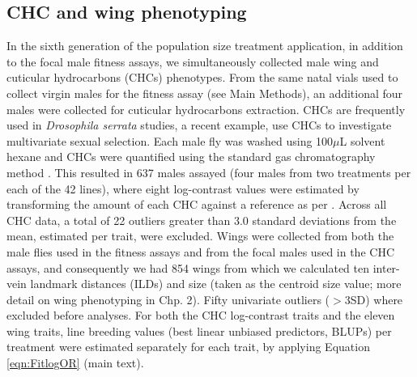 \subsection{CHC and wing phenotyping}
In the sixth generation of the population size treatment application, in addition to the focal male fitness assays, we simultaneously collected male wing and cuticular hydrocarbons (CHCs) phenotypes. From the same natal vials used to collect virgin males for the fitness assay (see Main Methods), an additional four males were collected for cuticular hydrocarbons extraction. CHCs are frequently used in \textit{Drosophila serrata} studies, a recent example, \citet{Redd21} use CHCs to investigate multivariate sexual selection. Each male fly was washed using 100$\mu$L solvent hexane and CHCs were quantified using the standard gas chromatography method \citep{Blow98}. This resulted in 637 males assayed (four males from two treatments per each of the 42 lines), where eight log-contrast values were estimated by transforming the amount of each CHC against a reference as per \citet{Aitc82}. Across all CHC data, a total of 22 outliers greater than 3.0 standard deviations from the mean, estimated per trait, were excluded. Wings were collected from both the male flies used in the fitness assays and from the focal males used in the CHC assays, and consequently we had 854 wings from which we calculated ten inter-vein landmark distances (ILDs) and size (taken as the centroid size value; more detail on wing phenotyping in Chp. 2). Fifty univariate outliers ($>3$SD) where excluded before analyses. For both the CHC log-contrast traits and the eleven wing traits, line breeding values (best linear unbiased predictors, BLUPs) per treatment were estimated separately for each trait, by applying Equation \ref{eqn:FitlogOR} (main text).\par

